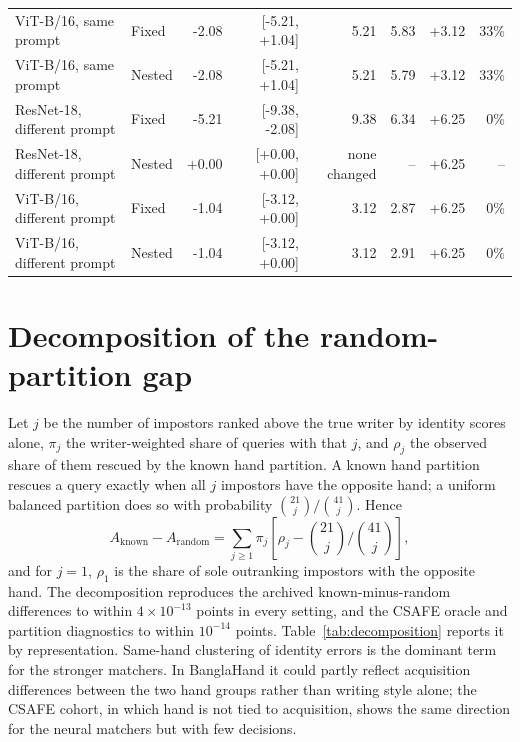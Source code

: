 \documentclass[10pt,a4paper]{article}
\begin{document}
\begin{table}[ht]
\begin{tabular}{llrrrrrr}
ViT-B/16, same prompt & Fixed & -2.08 & [-5.21, +1.04] & 5.21 & 5.83 & +3.12 & 33\% \\
ViT-B/16, same prompt & Nested & -2.08 & [-5.21, +1.04] & 5.21 & 5.79 & +3.12 & 33\% \\
ResNet-18, different prompt & Fixed & -5.21 & [-9.38, -2.08] & 9.38 & 6.34 & +6.25 & 0\% \\
ResNet-18, different prompt & Nested & +0.00 & [+0.00, +0.00] & none changed & -- & +6.25 & -- \\
ViT-B/16, different prompt & Fixed & -1.04 & [-3.12, +0.00] & 3.12 & 2.87 & +6.25 & 0\% \\
ViT-B/16, different prompt & Nested & -1.04 & [-3.12, +0.00] & 3.12 & 2.91 & +6.25 & 0\% \\
\bottomrule
\end{tabular}
\end{table}

\FloatBarrier
\section{Decomposition of the random-partition gap}
\label{sec:supdecomp}
Let $j$ be the number of impostors ranked above the true writer by identity scores alone, $\pi_j$ the writer-weighted share of queries with that $j$, and $\rho_j$ the observed share of them rescued by the known hand partition. A known hand partition rescues a query exactly when all $j$ impostors have the opposite hand; a uniform balanced partition does so with probability $\binom{21}{j}/\binom{41}{j}$. Hence
\begin{equation}
A_{\mathrm{known}}-A_{\mathrm{random}}=\sum_{j\geq1}\pi_j\left[\rho_j-\binom{21}{j}\Big/\binom{41}{j}\right],
\label{eq:supdecomp}
\end{equation}
and for $j=1$, $\rho_1$ is the share of sole outranking impostors with the opposite hand. The decomposition reproduces the archived known-minus-random differences to within $4\times10^{-13}$ points in every setting, and the CSAFE oracle and partition diagnostics to within $10^{-14}$ points. Table~\ref{tab:decomposition} reports it by representation. Same-hand clustering of identity errors is the dominant term for the stronger matchers. In BanglaHand it could partly reflect acquisition differences between the two hand groups rather than writing style alone; the CSAFE cohort, in which hand is not tied to acquisition, shows the same direction for the neural matchers but with few decisions.
\end{document}
